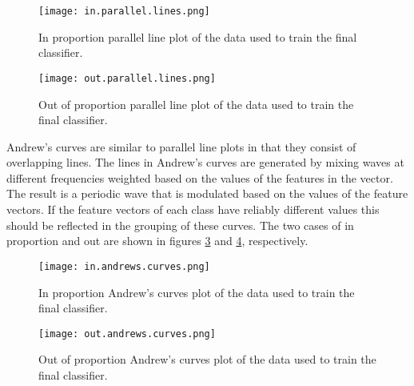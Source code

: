 \begin{figure}
    \texttt{[image: in.parallel.lines.png]}
    \centering
    \caption{In proportion parallel line plot of the data used to train the final classifier.}
    \label{fig:inparline}
\end{figure}

\begin{figure}
    \texttt{[image: out.parallel.lines.png]}   
    \centering
    \caption{Out of proportion parallel line plot of the data used to train the final classifier.}
    \label{fig:outparline}
\end{figure}

Andrew's curves are similar to parallel line plots in that they consist of overlapping lines.
The lines in Andrew's curves are generated by mixing waves at different frequencies weighted based on the values of the features in the vector\autocite{andrews_plots_1972}.
The result is a periodic wave that is modulated based on the values of the feature vectors.
If the feature vectors of each class have reliably different values this should be reflected in the grouping of these curves.
The two cases of in proportion and out are shown in figures \ref{fig:inandcurve} and \ref{fig:outandcurve}, respectively.

\begin{figure}
    \centering
    \texttt{[image: in.andrews.curves.png]}
    \caption{In proportion Andrew's curves plot of the data used to train the final classifier.}
    \label{fig:inandcurve}
\end{figure}

\begin{figure}
    \centering
    \texttt{[image: out.andrews.curves.png]}
    \caption{Out of proportion Andrew's curves plot of the data used to train the final classifier.}
    \label{fig:outandcurve}
\end{figure}

